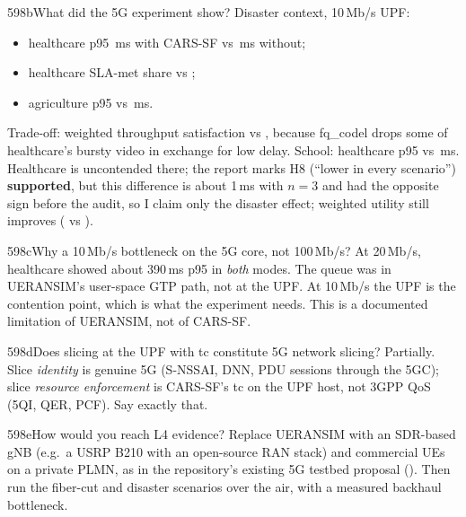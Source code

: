 \begin{qa}{598b}{What did the 5G experiment show?}
Disaster context, 10\,Mb/s UPF:
\begin{itemize}
\item healthcare p95 \NFgDisasterCarsHcP\,ms with CARS-SF vs \NFgDisasterNoneHcP\,ms without;
\item healthcare SLA-met share \NFgDisasterCarsHcSla{} vs \NFgDisasterNoneHcSla;
\item agriculture p95 \NFgDisasterCarsAgP{} vs \NFgDisasterNoneAgP\,ms.
\end{itemize}
Trade-off: weighted throughput satisfaction \NFgDisasterCarsUtil{} vs \NFgDisasterNoneUtil, because fq\_codel drops
some of healthcare's bursty video in exchange for low delay.
School: healthcare p95 \NFgSchoolCarsHcP{} vs \NFgSchoolNoneHcP\,ms. Healthcare is uncontended there; the report marks
H8 (``lower in every scenario'') \textbf{supported}, but this difference is about 1\,ms with $n=3$ and had the opposite
sign before the audit, so I claim only the disaster effect; weighted utility still improves
(\NFgSchoolCarsUtil{} vs \NFgSchoolNoneUtil).
\end{qa}

\begin{qa}{598c}{Why a 10\,Mb/s bottleneck on the 5G core, not 100\,Mb/s?}
At 20\,Mb/s, healthcare showed about 390\,ms p95 in \emph{both} modes. The queue was in UERANSIM's user-space GTP path,
not at the UPF. At 10\,Mb/s the UPF is the contention point, which is what the experiment needs. This is a documented
limitation of UERANSIM, not of CARS-SF.
\end{qa}

\begin{qa}{598d}{Does slicing at the UPF with tc constitute 5G network slicing?}
Partially. Slice \emph{identity} is genuine 5G (S-NSSAI, DNN, PDU sessions through the 5GC); slice \emph{resource
enforcement} is CARS-SF's tc on the UPF host, not 3GPP QoS (5QI, QER, PCF). Say exactly that.
\end{qa}

\begin{qa}{598e}{How would you reach L4 evidence?}
Replace UERANSIM with an SDR-based gNB (e.g.\ a USRP B210 with an open-source RAN stack) and commercial UEs on a
private PLMN, as in the repository's existing 5G testbed proposal (). Then run the
fiber-cut and disaster scenarios over the air, with a measured backhaul bottleneck.
\end{qa}


